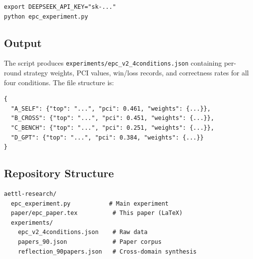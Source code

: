 \documentclass[11pt,a4paper]{article}
\begin{document}
\begin{verbatim}
export DEEPSEEK_API_KEY="sk-..."
python epc_experiment.py
\end{verbatim}

\subsection{Output}

The script produces \texttt{experiments/epc\_v2\_4conditions.json} containing per-round strategy weights, PCI values, win/loss records, and correctness rates for all four conditions. The file structure is:

\begin{verbatim}
{
  "A_SELF": {"top": "...", "pci": 0.461, "weights": {...}},
  "B_CROSS": {"top": "...", "pci": 0.451, "weights": {...}},
  "C_BENCH": {"top": "...", "pci": 0.251, "weights": {...}},
  "D_GPT": {"top": "...", "pci": 0.384, "weights": {...}}
}
\end{verbatim}

\subsection{Repository Structure}

\begin{verbatim}
aettl-research/
  epc_experiment.py           # Main experiment
  paper/epc_paper.tex          # This paper (LaTeX)
  experiments/
    epc_v2_4conditions.json    # Raw data
    papers_90.json             # Paper corpus
    reflection_90papers.json   # Cross-domain synthesis
\end{verbatim}
\end{document}
